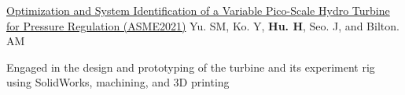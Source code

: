 \begin{cventries}
{\begin{cvitems}
    \end{cvitems}
    }
  \cvpublicationentrysimple
    {\href{https://asmedigitalcollection.asme.org/POWER/proceedings-abstract/POWER2020/83747/V001T08A020/1088386}{Optimization and System Identification of a Variable Pico-Scale Hydro Turbine for Pressure Regulation (ASME2021)}} %
    {Yu. SM, Ko. Y, \textbf{Hu. H}, Seo. J, and Bilton. AM} %
    {
    \begin{cvitems}
      \item Engaged in the design and prototyping of the turbine and its experiment rig using SolidWorks, machining, and 3D printing
    \end{cvitems}
    }
\end{cventries}








